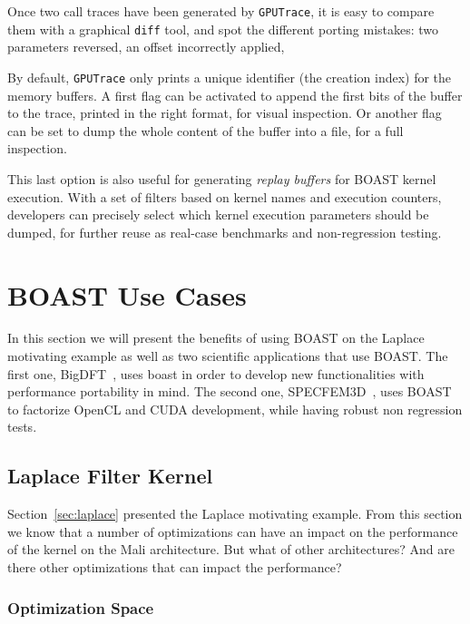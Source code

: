 \documentclass[11pt, a4paper, twoside]{montblanc}
\newcommand{\code}[1]{\texttt{#1}}
\begin{document}
Once two call traces have been generated by \code{GPUTrace}, it is
easy to compare them with a graphical \code{diff} tool, and spot the
different porting mistakes: two parameters reversed, an offset
incorrectly applied, \etc{}

By default, \code{GPUTrace} only prints a unique identifier (the
creation index) for the memory buffers. A first flag can be activated
to append the first bits of the buffer to the trace, printed in the
right format, for visual inspection. Or another flag can be set to
dump the whole content of the buffer into a file, for a full
inspection.

This last option is also useful for generating \emph{replay buffers}
for BOAST kernel execution. With a set of filters based on kernel
names and execution counters, developers can precisely select which
kernel execution parameters should be dumped, for further reuse as
real-case benchmarks and non-regression testing.

\section{BOAST Use Cases}
\label{use_cases}

In this section we will present the benefits of using BOAST on the Laplace
motivating example as well as two scientific applications that use BOAST. The
first one, BigDFT~\cite{genovese2008daubechies}, uses boast in order to develop new
functionalities with performance portability in mind. The second one,
SPECFEM3D~\cite{komatitsch2011fluid}, uses BOAST to factorize OpenCL and CUDA
development, while having robust non regression tests.

  \subsection{Laplace Filter Kernel}

Section~\ref{sec:laplace} presented the Laplace motivating example. From this
section we know that a number of optimizations can have an impact on the
performance of the kernel on the Mali architecture. But what of other
architectures? And are there other optimizations that can impact the
performance?

    \subsubsection{Optimization Space}
\end{document}
